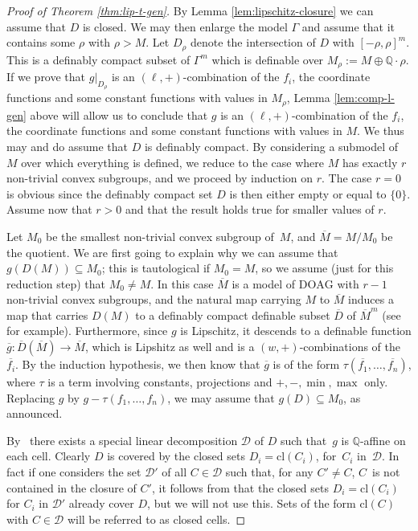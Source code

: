 \documentclass[10pt]{amsart}
\theoremstyle{definition}
\theoremstyle{remark}
\newcommand{\cl}{\mathrm{cl}}
\newcommand{\DOAG}{\mathrm{DOAG}}
\newcommand{\Q}{\mathbb Q}
\theoremstyle{plain}
\theoremstyle{definition}
\begin{document}
\begin{proof}[Proof of Theorem \ref{thm:lip-t-gen}]
By Lemma \ref{lem:lipschitz-closure}
we can assume that $D$ is closed.
We may then enlarge the model $\Gamma$
and assume that it contains some
$\rho$ with $\rho>M$. Let
$D_\rho$ denote the
intersection of $D$ with $[-\rho,\rho]^m$.
This is a definably compact subset of $\Gamma^m$
which is definable over $M_\rho:=M\oplus \Q\cdot \rho$.
If we prove that $g|_{D_\rho}$
is an $(\ell,+)$-combination of the $f_i$, the coordinate
functions and some constant functions with values in $M_\rho$,
Lemma \ref{lem:comp-l-gen}
above will allow us to conclude that $g$
is an $(\ell,+)$-combination of the $f_i$, the coordinate
functions and some constant functions with values in $M$.
We thus may and do assume that $D$ is definably compact.
By considering a
submodel of~$M$ over which everything is defined, we reduce to
the case
where
$M$ has exactly $r$ non-trivial convex subgroups,
and we proceed by induction
on $r$. The case $r=0$
is obvious since the definably compact set $D$ is then either empty
or equal to
$\{0\}$. Assume now
that $r>0$ and that the result holds true
for smaller values of $r$.\enlargethispage{.5\baselineskip}%

Let $M_0$ be the smallest non-trivial convex subgroup of~$M$, and $\overline{M}=M/M_0$ be the quotient.
We are first going to explain why we can assume that $g(D(M))
\subseteq M_0$; this is tautological if $M_0=M$, so we assume
(just for this reduction step) that $M_0\neq M$.
In this case $\overline M$
is a model of $\DOAG$ with $r-1$ non-trivial convex subgroups, and the natural map carrying $M$ to $\overline{M}$ induces a map that carries $D(M)$ to a definably compact
definable subset $\overline{D}$ of $\overline{M}^m$ (see~\cite[Th.\,4.1.1]{BP} for example). Furthermore, since $g$ is Lipschitz, it
descends to a definable function $\overline{g}:\overline{D}(\overline{M})\to \overline{M}$, which is Lipshitz as well
and is a $(w,+)$-combinations of the $\overline{f_i}$.
By the induction hypothesis, we then know that $\overline{g}$ is of the form $\tau(\overline{f_1},\ldots,\overline{f_n})$, where $\tau$ is a term involving constants, projections and $+,-,\min,\max$ only. Replacing $g$ by $g-\tau(f_1,\ldots,f_n)$, we may assume that $g(D)\subseteq M_0$, as announced.

By~\cite[Fact 2.2]{elef} there exists a special linear decomposition $\mathcal{D}$ of $D$ such that~$g$ is $\Q$-affine on each cell.
Clearly $D$ is covered by the closed sets $D_i = \cl (C_i)$, for~$C_i$ in~$\mathcal{D}$.
In fact if one considers the set
$\mathcal{D}'$ of all $C\in \mathcal{D}$ such that, for any $C'\neq C$, $C$~is not contained in the closure of $C'$, it follows from
\cite[Fact 2.3]{elef} that the closed sets $D_i = \cl (C_i)$ for
$C_i$ in $\mathcal{D}'$ already cover $D$, but we will not use this. Sets of the form $\cl (C)$ with $C \in \mathcal{D}$ will be referred to as closed cells.


\end{proof}
\end{document}
